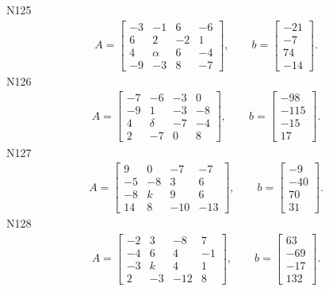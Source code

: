 \documentclass[11pt]{report}
\begin{document}
N125
\begin{align*}
 A = \left[\begin{matrix}-3 & -1 & 6 & -6\\6 & 2 & -2 & 1\\4 & \alpha & 6 & -4\\-9 & -3 & 8 & -7\end{matrix}\right],
\qquad b = \left[\begin{matrix}-21\\-7\\74\\-14\end{matrix}\right]. 
 \end{align*}
N126
\begin{align*}
 A = \left[\begin{matrix}-7 & -6 & -3 & 0\\-9 & 1 & -3 & -8\\4 & \delta & -7 & -4\\2 & -7 & 0 & 8\end{matrix}\right],
\qquad b = \left[\begin{matrix}-98\\-115\\-15\\17\end{matrix}\right]. 
 \end{align*}
N127
\begin{align*}
 A = \left[\begin{matrix}9 & 0 & -7 & -7\\-5 & -8 & 3 & 6\\-8 & k & 9 & 6\\14 & 8 & -10 & -13\end{matrix}\right],
\qquad b = \left[\begin{matrix}-9\\-40\\70\\31\end{matrix}\right]. 
 \end{align*}
N128
\begin{align*}
 A = \left[\begin{matrix}-2 & 3 & -8 & 7\\-4 & 6 & 4 & -1\\-3 & k & 4 & 1\\2 & -3 & -12 & 8\end{matrix}\right],
\qquad b = \left[\begin{matrix}63\\-69\\-17\\132\end{matrix}\right]. 
 \end{align*}
\end{document}
